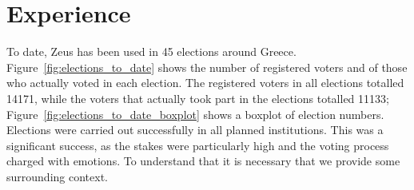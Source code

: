 \documentclass[letterpaper,10pt]{article}
\begin{document}






\section{Experience}
\label{sec:experience}

To date, Zeus has been used in 45 elections around Greece.
Figure~\ref{fig:elections_to_date} shows the number of registered
voters and of those who actually voted in each election. The
registered voters in all elections totalled 14171, while the voters
that actually took part in the elections totalled 11133;
Figure~\ref{fig:elections_to_date_boxplot} shows a boxplot of
election numbers. Elections were carried out successfully in all
planned institutions. This was a significant success, as the stakes
were particularly high and the voting process charged with emotions.
To understand that it is necessary that we provide some surrounding
context.
\end{document}
